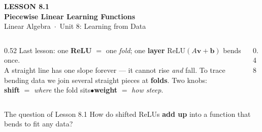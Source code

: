\documentclass[aspectratio=169, 11pt]{beamer}
\newcommand{\vv}{\mathbf{v}}
\newcommand{\bb}{\mathbf{b}}
\newcommand{\relu}{\mathrm{ReLU}}
\begin{document}
{
\begin{frame}[plain]
  \vspace{2.8cm}\hspace{0.55cm}%
  \begin{minipage}{0.9\textwidth}
    {\color{goldacc}\bfseries\small LESSON 8.1}\\[0.5cm]
    {\color{white}\bfseries\LARGE Piecewise Linear Learning Functions}\\[1.0cm]
    {\color{blushmid}\small Linear Algebra~$\cdot$~Unit 8: Learning from Data}
  \end{minipage}
\end{frame}
}

\begin{frame}[t, plain]
  \begin{columns}[T]
    \begin{column}{0.52\textwidth}
      Last lesson: one \textbf{ReLU} $=$ one \emph{fold}; one \textbf{layer} $\relu(A\vv+\bb)$ bends once.\\[6pt]
      A straight line has one slope forever --- it cannot rise \emph{and} fall. To trace bending data we join
      several straight pieces at \textbf{folds}. Two knobs:\\[4pt]
      \textbf{shift} $=$ \emph{where} the fold sits\quad$\bullet$\quad\textbf{weight} $=$ \emph{how steep}.
    \end{column}
    \begin{column}{0.48\textwidth}
      \centering
    \end{column}
  \end{columns}
  \vspace{2pt}
  \begin{block}{The question of Lesson 8.1}
    How do shifted ReLUs \textbf{add up} into a function that bends to fit any data?
  \end{block}
\end{frame}
\end{document}

